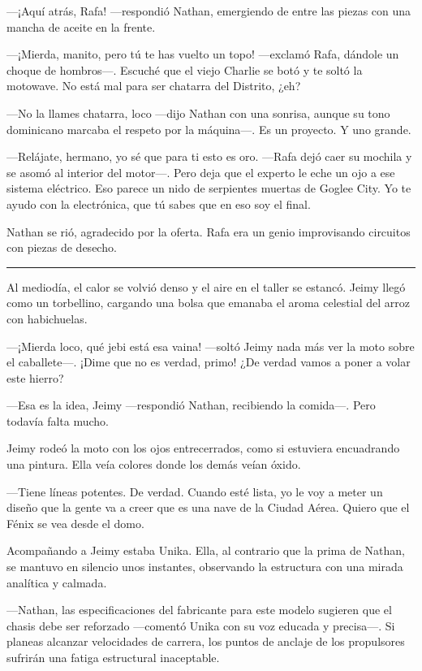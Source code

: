 \documentclass[12pt,a4paper]{book}
\begin{document}
---¡Aquí atrás, Rafa! ---respondió Nathan, emergiendo de entre las piezas con una mancha de aceite en la frente.

---¡Mierda, manito, pero tú te has vuelto un topo! ---exclamó Rafa, dándole un choque de hombros---. Escuché que el viejo Charlie se botó y te soltó la motowave. No está mal para ser chatarra del Distrito, ¿eh?

---No la llames chatarra, loco ---dijo Nathan con una sonrisa, aunque su tono dominicano marcaba el respeto por la máquina---. Es un proyecto. Y uno grande.

---Relájate, hermano, yo sé que para ti esto es oro. ---Rafa dejó caer su mochila y se asomó al interior del motor---. Pero deja que el experto le eche un ojo a ese sistema eléctrico. Eso parece un nido de serpientes muertas de Goglee City. Yo te ayudo con la electrónica, que tú sabes que en eso soy el final.

Nathan se rió, agradecido por la oferta. Rafa era un genio improvisando circuitos con piezas de desecho.

\bigskip
\noindent\rule{\textwidth}{0.4pt}
\bigskip

Al mediodía, el calor se volvió denso y el aire en el taller se estancó. Jeimy llegó como un torbellino, cargando una bolsa que emanaba el aroma celestial del arroz con habichuelas.

---¡Mierda loco, qué jebi está esa vaina! ---soltó Jeimy nada más ver la moto sobre el caballete---. ¡Dime que no es verdad, primo! ¿De verdad vamos a poner a volar este hierro?

---Esa es la idea, Jeimy ---respondió Nathan, recibiendo la comida---. Pero todavía falta mucho.

Jeimy rodeó la moto con los ojos entrecerrados, como si estuviera encuadrando una pintura. Ella veía colores donde los demás veían óxido.

---Tiene líneas potentes. De verdad. Cuando esté lista, yo le voy a meter un diseño que la gente va a creer que es una nave de la Ciudad Aérea. Quiero que el Fénix se vea desde el domo.

Acompañando a Jeimy estaba Unika. Ella, al contrario que la prima de Nathan, se mantuvo en silencio unos instantes, observando la estructura con una mirada analítica y calmada.

---Nathan, las especificaciones del fabricante para este modelo sugieren que el chasis debe ser reforzado ---comentó Unika con su voz educada y precisa---. Si planeas alcanzar velocidades de carrera, los puntos de anclaje de los propulsores sufrirán una fatiga estructural inaceptable.
\end{document}
